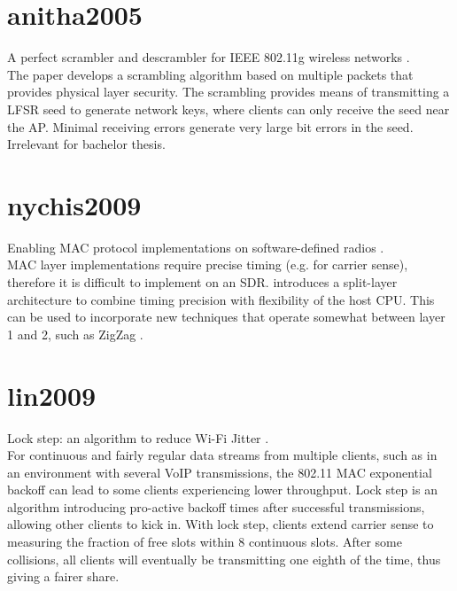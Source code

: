 
\section*{anitha2005}

A perfect scrambler and descrambler for IEEE 802.11g wireless networks \cite{anitha2005}.\\

The paper develops a scrambling algorithm based on multiple packets that provides physical layer security. The scrambling provides means of transmitting a LFSR seed to generate network keys, where clients can only receive the seed near the AP. Minimal receiving errors generate very large bit errors in the seed. Irrelevant for bachelor thesis.



\section*{nychis2009}

Enabling MAC protocol implementations on software-defined radios \cite{nychis2009}.\\

MAC layer implementations require precise timing (e.g. for carrier sense), therefore it is difficult to implement on an SDR. \cite{nychis2009} introduces a split-layer architecture to combine timing precision with flexibility of the host CPU. This can be used to incorporate new techniques that operate somewhat between layer 1 and 2, such as ZigZag \cite{gollakota2008}.



\section*{lin2009}

Lock step: an algorithm to reduce Wi-Fi Jitter \cite{lin2009}.\\

For continuous and fairly regular data streams from multiple clients, such as in an environment with several VoIP transmissions, the 802.11 MAC exponential backoff can lead to some clients experiencing lower throughput. Lock step is an algorithm introducing pro-active backoff times after successful transmissions, allowing other clients to kick in. With lock step, clients extend carrier sense to measuring the fraction of free slots within 8 continuous slots. After some collisions, all clients will eventually be transmitting one eighth of the time, thus giving a fairer share.


